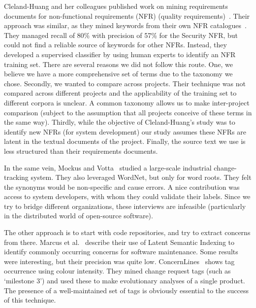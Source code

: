 \documentclass[]{sig-alternate}
\begin{document}
Cleland-Huang and her colleagues published work on mining requirements documents for non-functional requirements (NFR) (quality requirements)~\cite{Cleland-Huang2006}. 
Their approach was similar, as they mined keywords from their own NFR catalogues~\cite{chung99}.
They managed recall of 80\% with precision of 57\% for the Security NFR, but could not find a reliable source of keywords for other NFRs. 
Instead, they developed a supervised classifier by using human experts to identify an NFR training set. 
There are several reasons we did not follow this route. 
One, we believe we have a more comprehensive set of terms due to the taxonomy we chose. 
Secondly, we wanted to compare across projects. 
Their technique was not compared across different projects and the applicability of the training set to different corpora is unclear. 
A common taxonomy allows us to make inter-project comparison (subject to the assumption that all projects conceive of these terms in the same way). 
Thirdly, while the objective of Cleland-Huang's study was to identify new NFRs (for system development) our study assumes these NFRs are latent in the textual documents of the project. 
Finally, the source text we use is less structured than their requirements documents.

In the same vein, Mockus and Votta~\cite{Mockus00} studied a large-scale industrial change-tracking system. 
They also leveraged WordNet, but only for word roots. 
They felt the synonyms would be non-specific and cause errors. 
A nice contribution was access to system developers, with whom they could validate their labels. 
Since we try to bridge different organizations, these interviews are infeasible (particularly in the distributed world of open-source software).

The other approach is to start with code repositories, and try to extract concerns from there. 
Marcus et al.~\cite{marcus04wcre} describe their use of Latent Semantic Indexing to identify commonly occurring concerns for software maintenance. 
Some results were interesting, but their precision was quite low. 
ConcernLines~\cite{treude09cl} shows tag occurrence using colour intensity. 
They mined change request tags (such as `milestone 3') and used these to make evolutionary analyses of a single product. 
The presence of a well-maintained set of tags is obviously essential to the success of this technique.
\end{document}
